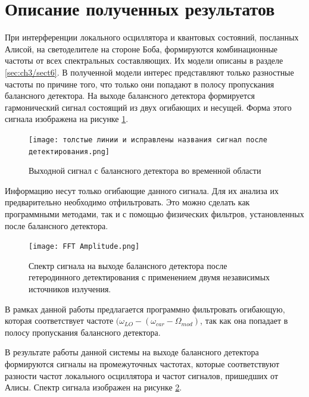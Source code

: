 \section{Описание полученных результатов}\label{sec:ch3/sect7}
При интерференции локального осциллятора и квантовых состояний, посланных Алисой, на светоделителе на стороне Боба, формируются комбинационные частоты от всех спектральных составляющих. Их модели описаны в разделе \ref*{sec:ch3/sect6}.
В полученной модели интерес представляют только разностные частоты по причине того, что только они попадают в полосу пропускания балансного детектора.
На выходе балансного детектора формируется гармонический сигнал состоящий из двух огибающих и несущей. Форма этого сигнала изображена на рисунке \ref*{fig: het true time}. 
\begin{figure}
    \centering
    \texttt{[image: толстые линии и исправлены названия сигнал после детектирования.png]}
    \caption{Выходной сигнал с балансного детектора во временной области}
    \label{fig: het true time}
\end{figure}
Информацию несут только огибающие данного сигнала. Для их анализа их предварительно необходимо отфильтровать. Это можно сделать как программными методами, так и с помощью физических фильтров, установленных после балансного детектора.
\begin{figure}
    \centering
    \texttt{[image: FFT Amplitude.png]}
    \caption{Спектр сигнала на выходе балансного детектора после гетеродинного детектирования с применением двумя независимых источников излучения.}
    \label{fig: het true spec}
\end{figure}
В рамках данной работы предлагается программно фильтровать огибающую, которая соответствует частоте $(\omega_{LO} -(\omega_{car} - \Omega_{mod})$, так как она попадает в полосу пропускания балансного детектора. 

В результате работы данной системы на выходе балансного детектора формируются сигналы на промежуточных частотах, которые соответствуют разности частот локального осциллятора и частот сигналов, пришедших от Алисы. Спектр сигнала изображен на рисунке \ref{fig: het true spec}.

